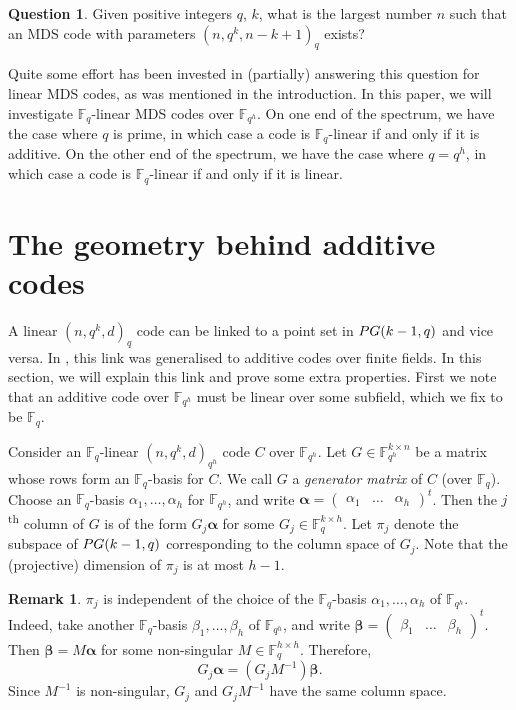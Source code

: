\documentclass[a4paper]{article}
\theoremstyle{definition}
\newtheorem{rmk}[thm]{Remark}
\newtheorem{que}[thm]{Question}
\newcommand{\FF}{\mathbb F}
\newcommand{\pg}{\textnormal{PG}}
\begin{document}
\begin{que}
Given positive integers $q$, $k$, what is the largest number $n$ such that an MDS code with parameters $(n,q^k,n-k+1)_q$ exists?
\end{que}

Quite some effort has been invested in (partially) answering this question for linear MDS codes, as was mentioned in the introduction.
In this paper, we will investigate $\FF_q$-linear MDS codes over $\FF_{q^h}$.
On one end of the spectrum, we have the case where $q$ is prime, in which case a code is $\FF_q$-linear if and only if it is additive.
On the other end of the spectrum, we have the case where $q=q^h$, in which case a code is $\FF_q$-linear if and only if it is linear.



\section{The geometry behind additive codes}
 \label{SecGeom}

A linear $(n,q^k,d)_q$ code can be linked to a point set in $\pg(k-1,q)$ and vice versa.
In \cite{gamboa}, this link was generalised to additive codes over finite fields.
In this section, we will explain this link and prove some extra properties. First we note that an additive code over $\FF_{q^h}$ must be linear over some subfield, which we fix to be $\FF_q$.

Consider an $\FF_q$-linear $(n,q^k,d)_{q^h}$ code $C$ over $\FF_{q^h}$.
Let $G \in \FF_{q^h}^{k \times n}$ be a matrix whose rows form an $\FF_q$-basis for $C$.
We call $G$ a \emph{generator matrix} of $C$ (over $\FF_q$).
Choose an $\FF_q$-basis $\alpha_1, \dots, \alpha_h$ for $\FF_{q^h}$, and write 
\(
 \boldsymbol \alpha = \begin{pmatrix} \alpha_1 & \dots & \alpha_h \end{pmatrix}^t
\).
Then the $j$\textsuperscript{th} column of $G$ is of the form $G_j \boldsymbol \alpha$ for some $G_j \in \FF_q^{k \times h}$.
Let $\pi_j$ denote the subspace of $\pg(k-1,q)$ corresponding to the column space of $G_j$.
Note that the (projective) dimension of $\pi_j$ is at most $h-1$.

\begin{rmk}
$\pi_j$ is independent of the choice of the $\FF_q$-basis $\alpha_1, \dots, \alpha_h$ of $\FF_{q^h}$.
Indeed, take another $\FF_q$-basis $\beta_1, \dots, \beta_h$ of $\FF_{q^h}$, and write 
\(
\boldsymbol \beta = \begin{pmatrix}
 \beta_1 & \dots & \beta_h
\end{pmatrix}^t
\).
Then
\(
 \boldsymbol \beta = M \boldsymbol \alpha
\)
for some non-singular $M \in \FF_q^{h \times h}$.
Therefore,
\[
 G_j \boldsymbol \alpha = (G_j M^{-1}) \boldsymbol \beta.
\]
Since $M^{-1}$ is non-singular, $G_j$ and $G_j M^{-1}$ have the same column space.
\end{rmk}
\end{document}
